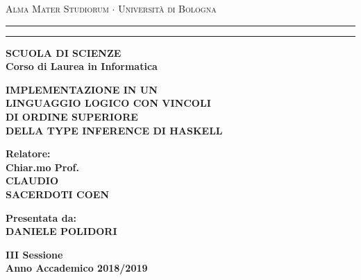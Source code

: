 \documentclass[12pt,a4paper]{report}
\begin{document}
\begin{titlepage}
\begin{center}
{{\Large{\textsc{Alma Mater Studiorum $\cdot$ Universit\`a di
Bologna}}}} \rule[0.1cm]{15.8cm}{0.1mm}
\rule[0.5cm]{15.8cm}{0.6mm}
{\small{\bf SCUOLA DI SCIENZE\\
Corso di Laurea in Informatica }}
\end{center}
\vspace{15mm}
\begin{center}
{\LARGE{\bf IMPLEMENTAZIONE IN UN}}\\
\vspace{3mm}
{\LARGE{\bf LINGUAGGIO LOGICO CON VINCOLI}}\\
\vspace{3mm}
{\LARGE{\bf DI ORDINE SUPERIORE}}\\
\vspace{3mm}
{\LARGE{\bf DELLA TYPE INFERENCE DI HASKELL}}\\
\end{center}
\vspace{40mm}
\par
\noindent
\begin{minipage}[t]{0.47\textwidth}
{\large{\bf Relatore:\\
Chiar.mo Prof.\\
CLAUDIO\\
SACERDOTI COEN}}
\end{minipage}
\hfill
\begin{minipage}[t]{0.47\textwidth}\raggedleft
{\large{\bf Presentata da:\\
DANIELE POLIDORI}}
\end{minipage}
\vspace{20mm}
\begin{center}
{\large{\bf III Sessione\\
Anno Accademico 2018/2019 }}
\end{center}
\end{titlepage}
\end{document}
